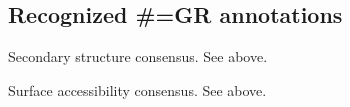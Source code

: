 \subsection{Recognized \#=GR annotations}

\begin{sreitems}{}
\item [\emcode{SS}]
	Secondary structure consensus. See  above.
\item [\emcode{SA}]
	Surface accessibility consensus. See  above.
\end{sreitems}


